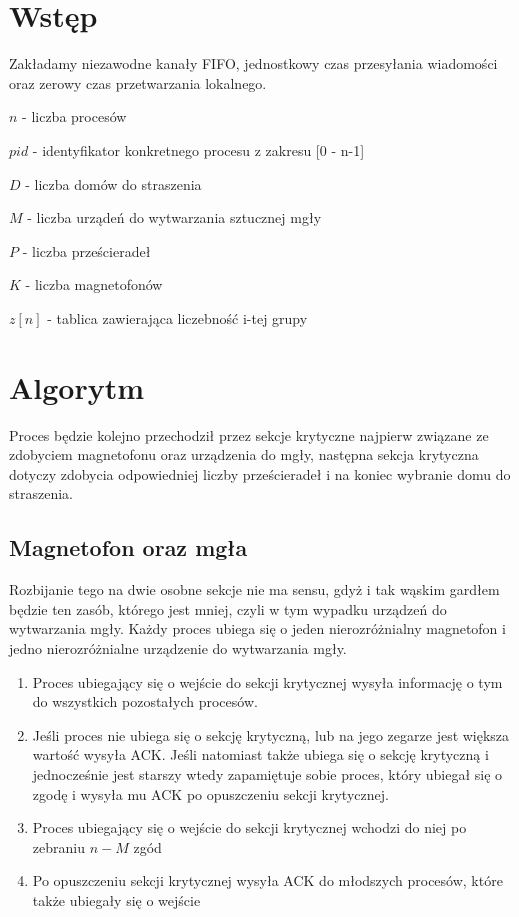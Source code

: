 \documentclass{article}
\begin{document}


\section{Wstęp}
Zakładamy niezawodne kanały FIFO, jednostkowy czas przesyłania wiadomości oraz zerowy czas przetwarzania lokalnego.
\begin{tightlist}
    \item $n$ - liczba procesów
    \item $pid$ - identyfikator konkretnego procesu z zakresu [0 - n-1]
    \item $D$ - liczba domów do straszenia
    \item $M$ - liczba urządeń do wytwarzania sztucznej mgły
    \item $P$ - liczba prześcieradeł
    \item $K$ - liczba magnetofonów
    \item $z[n]$ - tablica zawierająca liczebność i-tej grupy
\end{tightlist}

\section{Algorytm}
Proces będzie kolejno przechodził przez sekcje krytyczne najpierw związane ze zdobyciem magnetofonu oraz urządzenia do mgły, następna sekcja krytyczna dotyczy zdobycia odpowiedniej liczby prześcieradeł i na koniec wybranie domu do straszenia.
\subsection{Magnetofon oraz mgła}
Rozbijanie tego na dwie osobne sekcje nie ma sensu, gdyż i tak wąskim gardłem będzie ten zasób, którego jest mniej, czyli w tym wypadku urządzeń do wytwarzania mgły. Każdy proces ubiega się o jeden nierozróżnialny magnetofon i jedno nierozróżnialne urządzenie do wytwarzania mgły.
\begin{enumerate}
    \item Proces ubiegający się o wejście do sekcji krytycznej wysyła informację o tym do wszystkich pozostałych procesów. 
    \item Jeśli proces nie ubiega się o sekcję krytyczną, lub na jego zegarze jest większa wartość wysyła ACK. Jeśli natomiast także ubiega się o sekcję krytyczną i jednocześnie jest starszy wtedy zapamiętuje sobie proces, który ubiegał się o zgodę i wysyła mu ACK po opuszczeniu sekcji krytycznej.
    \item Proces ubiegający się o wejście do sekcji krytycznej wchodzi do niej po zebraniu $n - M$ zgód
    \item Po opuszczeniu sekcji krytycznej wysyła ACK do młodszych procesów, które także ubiegały się o wejście
\end{enumerate}
\end{document}
